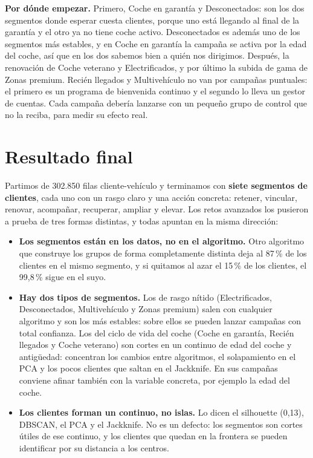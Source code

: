 \documentclass[11pt,a4paper]{article}
\begin{document}
\textbf{Por dónde empezar.} Primero, Coche en garantía y Desconectados: son los dos segmentos donde esperar cuesta clientes, porque uno está llegando al final de la garantía y el otro ya no tiene coche activo. Desconectados es además uno de los segmentos más estables, y en Coche en garantía la campaña se activa por la edad del coche, así que en los dos sabemos bien a quién nos dirigimos. Después, la renovación de Coche veterano y Electrificados, y por último la subida de gama de Zonas premium. Recién llegados y Multivehículo no van por campañas puntuales: el primero es un programa de bienvenida continuo y el segundo lo lleva un gestor de cuentas. Cada campaña debería lanzarse con un pequeño grupo de control que no la reciba, para medir su efecto real.

\section{Resultado final}

Partimos de 302.850 filas cliente-vehículo y terminamos con \textbf{siete segmentos de clientes}, cada uno con un rasgo claro y una acción concreta: retener, vincular, renovar, acompañar, recuperar, ampliar y elevar. Los retos avanzados los pusieron a prueba de tres formas distintas, y todas apuntan en la misma dirección:

\begin{itemize}
  \item \textbf{Los segmentos están en los datos, no en el algoritmo.} Otro algoritmo que construye los grupos de forma completamente distinta deja al 87\,\% de los clientes en el mismo segmento, y si quitamos al azar el 15\,\% de los clientes, el 99,8\,\% sigue en el suyo.
  \item \textbf{Hay dos tipos de segmentos.} Los de rasgo nítido (Electrificados, Desconectados, Multivehículo y Zonas premium) salen con cualquier algoritmo y son los más estables: sobre ellos se pueden lanzar campañas con total confianza. Los del ciclo de vida del coche (Coche en garantía, Recién llegados y Coche veterano) son cortes en un continuo de edad del coche y antigüedad: concentran los cambios entre algoritmos, el solapamiento en el PCA y los pocos clientes que saltan en el Jackknife. En sus campañas conviene afinar también con la variable concreta, por ejemplo la edad del coche.
  \item \textbf{Los clientes forman un continuo, no islas.} Lo dicen el silhouette (0,13), DBSCAN, el PCA y el Jackknife. No es un defecto: los segmentos son cortes útiles de ese continuo, y los clientes que quedan en la frontera se pueden identificar por su distancia a los centros.
\end{itemize}
\end{document}
